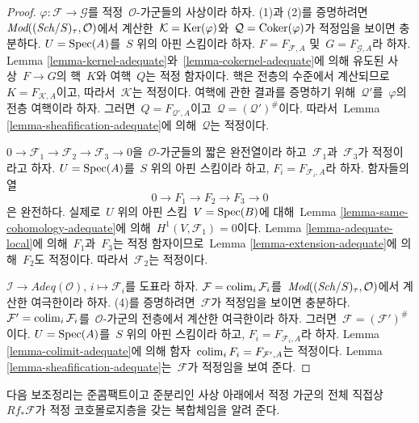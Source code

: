 \begin{proof}
$\varphi : \mathcal{F} \to \mathcal{G}$를 적정\ 
$\mathcal{O}$-가군들의 사상이라 하자. (1)과 (2)를 증명하려면\ 
$\textit{Mod}((\mathit{Sch}/S)_\tau, \mathcal{O})$에서 계산한\ 
$\mathcal{K} = \mathop{\mathrm{Ker}}(\varphi)$와\  $\mathcal{Q} = \mathop{\mathrm{Coker}}(\varphi)$가
적정임을 보이면 충분하다. $U = \mathop{\mathrm{Spec}}(A)$를\  $S$ 위의 아핀
스킴이라 하자. $F = F_{\mathcal{F}, A}$ 및\ 
$G = F_{\mathcal{G}, A}$라 하자. Lemma
\ref{lemma-kernel-adequate}와\  \ref{lemma-cokernel-adequate}에 의해
유도된 사상\  $F \to G$의 핵\  $K$와 여핵\  $Q$는 적정 함자이다.
핵은 전층의 수준에서 계산되므로\  $K = F_{\mathcal{K}, A}$이고,
따라서\  $\mathcal{K}$는 적정이다. 여핵에 관한 결과를 증명하기 위해\ 
$\mathcal{Q}'$를\  $\varphi$의 전층 여핵이라 하자. 그러면\ 
$Q = F_{\mathcal{Q}', A}$이고\  $\mathcal{Q} = (\mathcal{Q}')^\#$이다.
따라서\  Lemma \ref{lemma-sheafification-adequate}에 의해\ 
$\mathcal{Q}$는 적정이다.

\medskip\noindent
$0 \to \mathcal{F}_1 \to \mathcal{F}_2 \to \mathcal{F}_3 \to 0$을\ 
$\mathcal{O}$-가군들의 짧은 완전열이라 하고\  $\mathcal{F}_1$과\ 
$\mathcal{F}_3$가 적정이라고 하자. $U = \mathop{\mathrm{Spec}}(A)$를\  $S$ 위의
아핀 스킴이라 하고, $F_i = F_{\mathcal{F}_i, A}$라 하자.
함자들의 열
$$
0 \to F_1 \to F_2 \to F_3 \to 0
$$
은 완전하다. 실제로\  $U$ 위의 아핀 스킴\  $V = \mathop{\mathrm{Spec}}(B)$에 대해\ 
Lemma \ref{lemma-same-cohomology-adequate}에 의해\ 
$H^1(V, \mathcal{F}_1) = 0$이다. Lemma
\ref{lemma-adequate-local}에 의해\  $F_1$과\  $F_3$는 적정 함자이므로\ 
Lemma \ref{lemma-extension-adequate}에 의해\  $F_2$도 적정이다.
따라서\  $\mathcal{F}_2$는 적정이다.

\medskip\noindent
$\mathcal{I} \to \textit{Adeq}(\mathcal{O})$,
$i \mapsto \mathcal{F}_i$를 도표라 하자.
$\mathcal{F} = \mathop{\mathrm{colim}}\nolimits_i \mathcal{F}_i$를\ 
$\textit{Mod}((\mathit{Sch}/S)_\tau, \mathcal{O})$에서 계산한 여극한이라
하자. (4)를 증명하려면\  $\mathcal{F}$가 적정임을 보이면 충분하다.
$\mathcal{F}' = \mathop{\mathrm{colim}}\nolimits_i \mathcal{F}_i$를\  $\mathcal{O}$-가군의
전층에서 계산한 여극한이라 하자. 그러면\ 
$\mathcal{F} = (\mathcal{F}')^\#$이다. $U = \mathop{\mathrm{Spec}}(A)$를\  $S$ 위의
아핀 스킴이라 하고, $F_i = F_{\mathcal{F}_i, A}$라 하자.
Lemma \ref{lemma-colimit-adequate}에 의해 함자\ 
$\mathop{\mathrm{colim}}\nolimits_i F_i = F_{\mathcal{F}', A}$는 적정이다. Lemma
\ref{lemma-sheafification-adequate}는\  $\mathcal{F}$가 적정임을 보여 준다.
\end{proof}

\noindent
다음 보조정리는 준콤팩트이고 준분리인 사상 아래에서 적정 가군의
전체 직접상\  $Rf_*\mathcal{F}$가 적정 코호몰로지층을
갖는 복합체임을 알려 준다.

